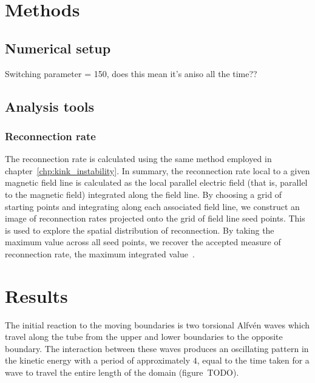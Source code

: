 \section{Methods}

\subsection{Numerical setup}


Switching parameter = 150, does this mean it's aniso all the time??

\subsection{Analysis tools}

\subsubsection{Reconnection rate}

The reconnection rate is calculated using the same method employed in chapter~\ref{chp:kink_instability}. In summary, the reconnection rate local to a given magnetic field line is calculated as the local parallel electric field (that is, parallel to the magnetic field) integrated along the field line. By choosing a grid of starting points and integrating along each associated field line, we construct an image of reconnection rates projected onto the grid of field line seed points. This is used to explore the spatial distribution of reconnection. By taking the maximum value across all seed points, we recover the accepted measure of reconnection rate, the maximum integrated value~\cite{galsgaardSteadyStateReconnection2011,priestNatureThreedimensionalMagnetic2003,schindlerGeneralMagneticReconnection1988}.

\section{Results}


The initial reaction to the moving boundaries is two torsional Alfv\'en waves which travel along the tube from the upper and lower boundaries to the opposite boundary. The interaction between these waves produces an oscillating pattern in the kinetic energy with a period of approximately $4$, equal to the time taken for a wave to travel the entire length of the domain (figure~TODO).

